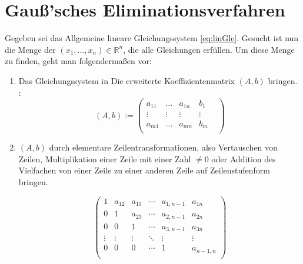 \documentclass[a4paper, 12pt]{report}
\newcommand{\GE}{Gauß'sches Eliminationsverfahren}
\begin{document}
{\let\clearpage\relax \chapter{\GE}} \label{2.2}
Gegeben sei das Allgemeine lineare Gleichungssystem \ref{eq:linGle}.
Gesucht ist nun die Menge der $ (x_1, \hdots ,x_n ) \in \mathbb{R}^n $, die alle Gleichungen erfüllen.
Um diese Menge zu finden, geht man folgendermaßen vor:
\begin{enumerate}
    \item Das Gleichungssystem in Die erweiterte Koeffizientenmatrix $ (A, b) $ bringen. \cite{2}:
        \begin{equation}
            (A, b):=
            \begin{pmatrix}
                a_{11} & \hdots &  a_{1n} &  b_1  \\
                \vdots & \vdots &  \vdots & \vdots &  \\
                a_{m1} &  \hdots &  a_{mn} &  b_m \\
            \end{pmatrix}
        \end{equation}
    \item $(A, b)$ durch elementare Zeilentransformationen, also Vertauschen von Zeilen,
        Multiplikation einer Zeile mit einer Zahl $\neq 0 $ oder Addition des Vielfachen von einer Zeile zu einer
        anderen Zeile auf Zeilenstufenform bringen.
        \begin{center}
            \begin{equation}
                \label{Zeilenstufenform}
                \left(\begin{array}{cccccc}
                        1 & a_{12} & a_{13} & \cdots & a_{1,n-1} & a_{1n} \\
                        0 & 1 & a_{23} & \cdots & a_{2,n-1} & a_{2n} \\
                        0 & 0 & 1 & \cdots & a_{3,n-1} & a_{3n} \\
                        \vdots & \vdots & \vdots & \ddots & \vdots & \vdots \\
                        0 & 0 & 0 & \cdots & 1 & a_{n-1,n} \\
                \end{array}\right)
            \end{equation}
        \end{center}


\end{enumerate}
\end{document}
